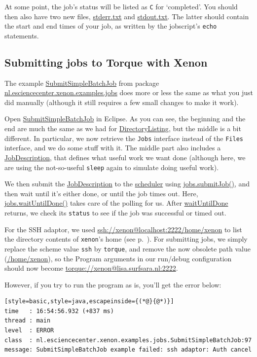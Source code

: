 \documentclass[12pt, a4paper, twoside, openany, titlepage]{book}
\begin{document}
At some point, the job's status will be listed as \texttt{C} for `completed'. You should then also have two new files, \url{stderr.txt} and \url{stdout.txt}. The latter should contain the start and end times of your job, as written by the jobscript's \texttt{echo} statements.

\subsection{Submitting jobs to Torque with Xenon}

The example \url{SubmitSimpleBatchJob} from package \url{nl.esciencecenter.xenon.examples.jobs} does more or less the same as what you just did manually (although it still requires a few small changes to make it work).

Open \url{SubmitSimpleBatchJob} in Eclipse. As you can see, the beginning and the end are much the same as we had for \url{DirectoryListing}, but the middle is a bit different. In particular, we now retrieve the \texttt{Jobs} interface instead of the \texttt{Files} interface, and we do some stuff with it. The middle part also includes a \url{JobDescription}, that defines what useful work we want done (although here, we are using the not-so-useful \texttt{sleep} again to simulate doing useful work).

We then submit the \url{JobDescription} to the \url{scheduler} using \url{jobs.submitJob()}, and then wait until it's either done, or until the job times out. Here, \url{jobs.waitUntilDone()} takes care of the polling for us. After \url{waitUntilDone} returns, we check its \texttt{status} to see if the job was successful or timed out.

For the SSH adaptor, we used \url{ssh://xenon@localhost:2222/home/xenon} to list the directory contents of \texttt{xenon}'s home (see p.~\pageref{eclipse-ssh-to-tremendous-torque}). For submitting jobs, we simply replace the scheme value \texttt{ssh} by \texttt{torque}, and remove the now obsolete path value (\url{/home/xenon}), so the \textsf{Program arguments} in our run/debug configuration should now become \url{torque://xenon@lisa.surfsara.nl:2222}.

However, if you try to run the program as is, you'll get the error below:
\begin{lstlisting}[style=basic,style=java,escapeinside={(*@}{@*)}]
time   : 16:54:56.932 (+837 ms)
thread : main
level  : ERROR
class  : nl.esciencecenter.xenon.examples.jobs.SubmitSimpleBatchJob:97
message: SubmitSimpleBatchJob example failed: ssh adaptor: Auth cancel
\end{lstlisting}
\end{document}
